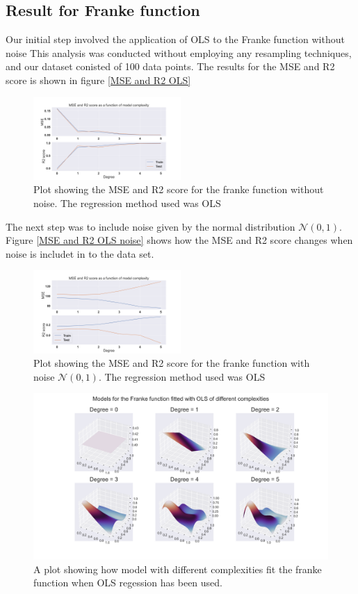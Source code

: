 \thispagestyle{plain}
\subsection{Result for Franke function}
\noindent Our initial step involved the application of OLS to the Franke function without noise
This analysis was conducted without employing any resampling techniques, 
and our dataset conisted of 100 data points. The results for the MSE and R2 score is shown in 
figure \eqref{MSE and R2 OLS}

\begin{figure}[h]
	\centering
	\includegraphics[width=0.5\textwidth]{Figure_3.png}
	\caption{Plot showing the MSE and R2 score for the franke function without noise. The regression method used was OLS}
	\label{MSE and R2 OLS}
\end{figure}
\noindent The next step was to include noise given by the normal distribution $\mathcal{N}(0,1)$. Figure \eqref{MSE and R2 OLS noise} shows
how the MSE and R2 score changes when noise is includet in to the data set.
\begin{figure}[h]
	\centering
	\includegraphics[width=0.5\textwidth]{Figure_4.png}
	\caption{Plot showing the MSE and R2 score for the franke function with noise $\mathcal{N}(0,1)$. The regression method used was OLS}
	\label{MSE and R2 OLS noise}
\end{figure}
\begin{figure}[h]
	\centering
	\includegraphics[width=\textwidth]{Figure_2.png}
	\caption{A plot showing how model with different complexities fit the franke function when OLS regession has been used.}
	\label{OLS figure}
\end{figure}


